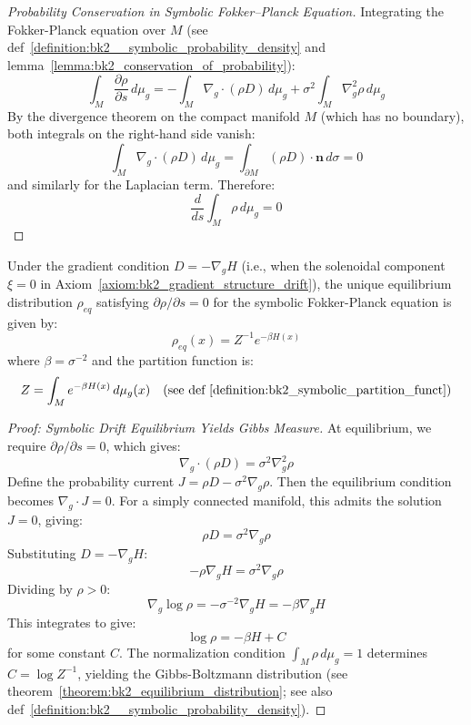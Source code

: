 \begin{proof}[Probability Conservation in Symbolic Fokker–Planck Equation]
\label{proof:bk2_fokker_planck_probability_conservation}
Integrating the Fokker-Planck equation over $M$ (see def~\ref{definition:bk2__symbolic_probability_density} and lemma~\ref{lemma:bk2_conservation_of_probability}):
\[
\int_M \frac{\partial \rho}{\partial s} \, d\mu_g 
= -\int_M \nabla_g \cdot (\rho D) \, d\mu_g 
+ \sigma^2 \int_M \nabla_g^2 \rho \, d\mu_g
\]
By the divergence theorem on the compact manifold $M$ (which has no boundary), both integrals on the right-hand side vanish:
\[
\int_M \nabla_g \cdot (\rho D) \, d\mu_g = \int_{\partial M} (\rho D) \cdot \mathbf{n} \, d\sigma = 0
\]
and similarly for the Laplacian term. Therefore:
\[
\frac{d}{ds} \int_M \rho \, d\mu_g = 0
\]
\end{proof}

\begin{theorem} 
\label{theorem:bk2_equilibrium_distribution} 
Under the gradient condition $D = -\nabla_g H$ (i.e., when the solenoidal component $\xi = 0$ in Axiom~\ref{axiom:bk2_gradient_structure_drift}), the unique equilibrium distribution $\rho_{eq}$ satisfying $\partial \rho / \partial s = 0$ for the symbolic Fokker-Planck equation is given by:
\[
\rho_{eq}(x) = Z^{-1} e^{-\beta H(x)}
\]
where $\beta = \sigma^{-2}$ and the partition function is:
\[
Z = \int_M e^{-\beta H(x)} \, d\mu_g(x) \quad \text{(see def~\ref{definition:bk2_symbolic_partition_funct})}
\]
\end{theorem}

\begin{proof}[Proof: Symbolic Drift Equilibrium Yields Gibbs Measure]
\label{proof:bk2_symbolic_drift_equilibrium_yields_gibbs_measure}
At equilibrium, we require $\partial \rho / \partial s = 0$, which gives:
\[
\nabla_g \cdot (\rho D) = \sigma^2 \nabla_g^2 \rho
\]
Define the probability current $J = \rho D - \sigma^2 \nabla_g \rho$. Then the equilibrium condition becomes $\nabla_g \cdot J = 0$. For a simply connected manifold, this admits the solution $J = 0$, giving:
\[
\rho D = \sigma^2 \nabla_g \rho
\]
Substituting $D = -\nabla_g H$:
\[
-\rho \nabla_g H = \sigma^2 \nabla_g \rho
\]
Dividing by $\rho > 0$:
\[
\nabla_g \log \rho = -\sigma^{-2} \nabla_g H = -\beta \nabla_g H
\]
This integrates to give:
\[
\log \rho = -\beta H + C
\]
for some constant $C$. The normalization condition $\int_M \rho \, d\mu_g = 1$ determines $C = \log Z^{-1}$, yielding the Gibbs-Boltzmann distribution (see theorem~\ref{theorem:bk2_equilibrium_distribution}; see also def~\ref{definition:bk2__symbolic_probability_density}).
\end{proof}

